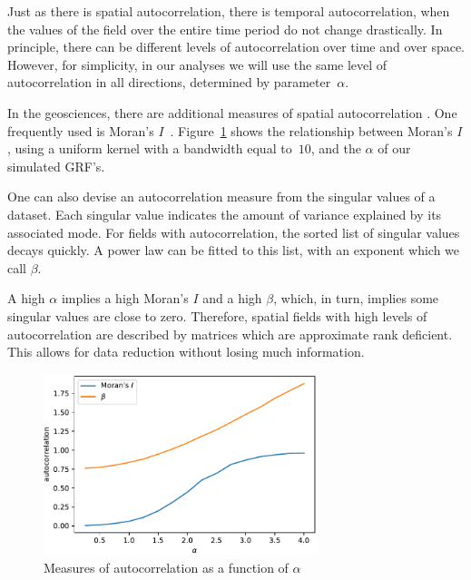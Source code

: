 \documentclass[ijgi,article,submit,moreauthors,pdftex,10pt,a4paper]{Definitions/mdpi}
\begin{document}
Just as there is spatial autocorrelation, there is temporal autocorrelation, when the values of the field over the entire time period do not change drastically. In principle, there can be different levels of autocorrelation over time and over space. However, for simplicity, in our analyses we will use the same level of autocorrelation in all directions, determined by parameter~$\alpha$.


In the geosciences, there are additional measures of spatial autocorrelation \cite{Eshel2011, Storch1999}. One frequently used is Moran's $I$~\cite{Moran1950, Hubert1981, PySAL}. Figure~\ref{fig:plotMoransIAndBeta} shows the relationship between Moran's $I$, using a uniform kernel with a bandwidth equal to~$10$, and the $\alpha$ of our simulated GRF's.

One can also devise an autocorrelation measure from the singular values of a dataset. Each singular value indicates the amount of variance explained by its associated mode. For fields with autocorrelation, the sorted list of singular values decays quickly. A power law can be fitted to this list, with an exponent which we call $\beta$.

A high $\alpha$ implies a high Moran's $I$ and a high $\beta$, which, in turn, implies some singular values are close to zero. Therefore, spatial fields with high levels of autocorrelation are described by matrices which are approximate rank deficient. This allows for data reduction without losing much information.

\begin{figure}[H]
\centering
\includegraphics[width=80mm]{Results/plotMoransIAndBeta.pdf}
\caption[Various measures of autocorrelation]{Measures of autocorrelation as a function of $\alpha$}
\label{fig:plotMoransIAndBeta}
\end{figure}
\end{document}
